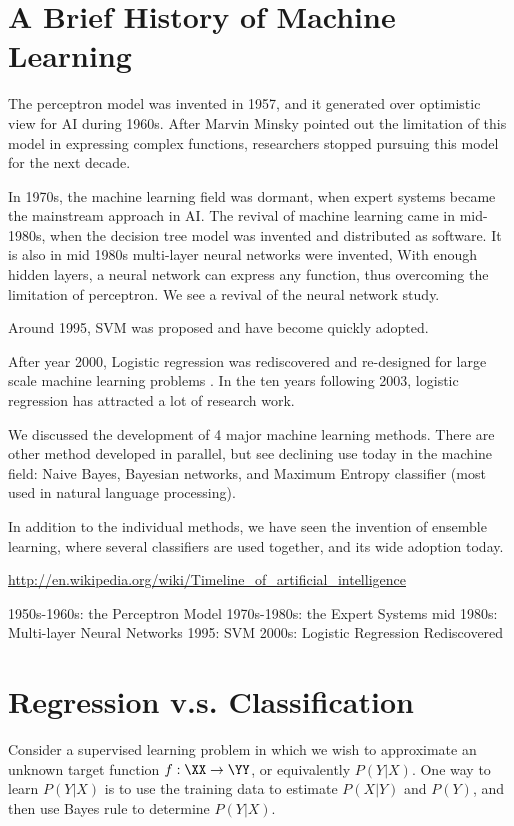 \documentclass{book}
\begin{document}
\chapter{A Brief History of Machine Learning}
The perceptron model was invented in 1957, and it generated over optimistic view for AI during 1960s. After Marvin Minsky pointed out the limitation of this model in expressing complex functions, researchers stopped pursuing this model for the next decade.

In 1970s, the machine learning field was dormant, when expert systems became the mainstream approach in AI.  The revival of machine learning came in mid-1980s, when the decision tree model was invented and distributed as software. It is also in mid 1980s multi-layer neural networks were invented, With enough hidden layers, a neural network can express any function, thus overcoming the limitation of perceptron. We see a revival of the neural network study.

Around 1995, SVM was proposed and have become quickly adopted.

After year 2000, Logistic regression was rediscovered and re-designed for large scale machine learning problems . In the ten years following 2003, logistic regression has attracted a lot of research work.

We discussed the development of 4 major machine learning methods. There are other method developed in parallel, but see declining use today in the machine field: Naive Bayes, Bayesian networks, and Maximum Entropy classifier (most used in natural language processing).

In addition to the individual methods, we have seen the invention of ensemble learning, where several classifiers are used together, and its wide adoption today.


\url{http://en.wikipedia.org/wiki/Timeline_of_artificial_intelligence}

1950s-1960s: the Perceptron Model
1970s-1980s: the Expert Systems
mid 1980s: Multi-layer Neural Networks
1995: SVM
2000s: Logistic Regression Rediscovered



\chapter{Regression v.s. Classification}
Consider a supervised learning problem in which we wish to approximate an unknown target function $f: \XX \to \YY$, or equivalently $P(Y|X)$. One way to learn $P(Y|X)$ is to use the training data to estimate $P(X|Y)$ and $P(Y)$, and then use Bayes rule to determine $P(Y|X)$.
\end{document}
